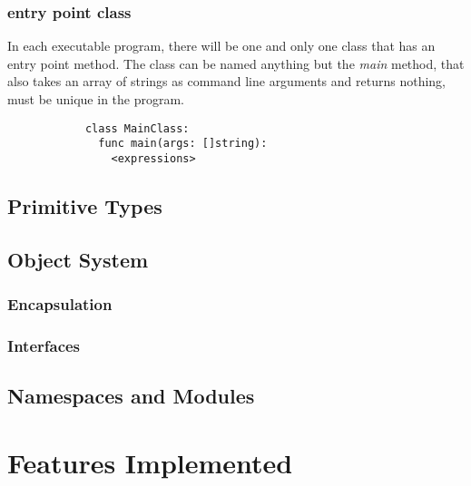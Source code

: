 \documentclass{article}
\newcommand{\centersec}[1]{\section*{\hfil #1 \hfil}}
\newcommand{\subcentersec}[1]{\subsection*{\hfil #1 \hfil}}
\newcommand{\subsubcentersec}[1]{\subsubsection*{\hfil #1 \hfil}}
\begin{document}
        \subsubsection*{entry point class}
          In each executable program, there will be one and only one
          class that has an entry point method. The class can be
          named anything but the \textit{main} method, that also takes
          an array of strings as command line arguments and returns nothing,
          must be unique in the program.
          \begin{verbatim}
            class MainClass:
              func main(args: []string):
                <expressions>
          \end{verbatim}

    \subcentersec{Primitive Types}
    \subcentersec{Object System}
      \subsubcentersec{Encapsulation}
      \subsubcentersec{Interfaces}
    \subcentersec{Namespaces and Modules}

  \centersec{Features Implemented}
\end{document}
